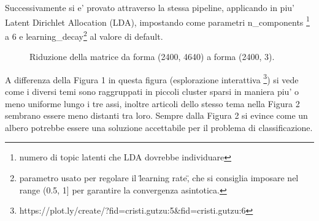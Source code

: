 \documentclass[runningheads]{llncs}
\begin{document}
\qquad
\qquad



Successivamente si e' provato attraverso la stessa pipeline, applicando in piu' Latent Dirichlet Allocation (LDA), impostando come parametri n\_components \footnote{numero di topic latenti che LDA dovrebbe individuare} a 6 e learning\_decay\footnote{parametro usato per regolare il \"learning rate\", che si consiglia imposare nel range (0.5, 1] per garantire la convergenza asintotica.} al valore di default.







\begin{figure}%
    \centering
    \qquad
    \caption{Riduzione della matrice da forma (2400, 4640) a forma (2400, 3). }%
    \label{fig:tsne2}%
\end{figure}


A differenza della Figura 1 in questa figura (esplorazione interattiva
\footnote{https://plot.ly/create/?fid=cristi.gutzu:5\&fid=cristi.gutzu:6}) si vede come i diversi temi sono raggruppati in piccoli cluster sparsi in maniera piu' o meno uniforme lungo i tre assi, inoltre articoli dello stesso tema nella Figura 2 sembrano essere meno distanti tra loro. Sempre dalla Figura 2 si evince come un albero potrebbe essere una soluzione accettabile per il problema di classificazione.
\end{document}

